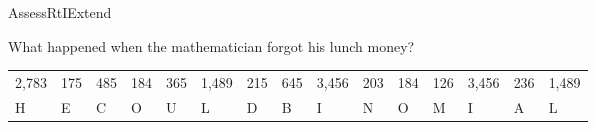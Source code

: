 \documentclass{article}
\newenvironment{te-addendum}[2]{}{}     %
\newcommand{\answer}[1]{}               %
\newcommand{\te}[1]{}                   %
\begin{document}
\begin{te-addendum}{Assess}{RtIExtend}
\answer{8. (\begin{bmatrix}w\\x\\y\\z\end{bmatrix}=\begin{bmatrix}168\\426\\76\\458\end{bmatrix})}
What happened when the mathematician forgot his lunch money?
\begin{tabular}{lllllllllllllll}
2,783 & 175 & 485 & 184 & 365 & 1,489 & 215 & 645 & 3,456 & 203 & 184 & 126 & 3,456 & 236 & 1,489 \\
H & E & C & O & U & L & D & B & I & N & O & M & I & A & L \\
\end{tabular}
\answer{HE COULD BINOMIAL}
\te{enVision Algebra 2 • Teaching Resources. Copyright Savvas Learning Company LLC. All Rights Reserved.}
\end{te-addendum}
\end{document}
